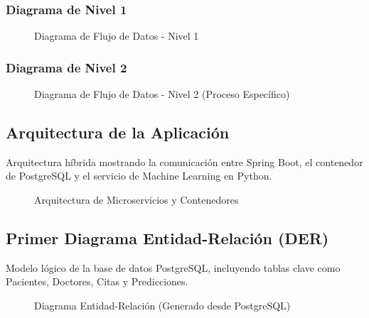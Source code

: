 \documentclass[12pt, a4paper]{article}
\begin{document}
	\subsubsection{Diagrama de Nivel 1}
	\begin{figure}[H]
		\centering
		\caption{Diagrama de Flujo de Datos - Nivel 1}
	\end{figure}
	
	\subsubsection{Diagrama de Nivel 2}
	\begin{figure}[H]
		\centering
		\caption{Diagrama de Flujo de Datos - Nivel 2 (Proceso Específico)}
	\end{figure}
	
	\subsection{Arquitectura de la Aplicación}
	Arquitectura híbrida mostrando la comunicación entre Spring Boot, el contenedor de PostgreSQL y el servicio de Machine Learning en Python.
	\begin{figure}[H]
		\centering
		\caption{Arquitectura de Microservicios y Contenedores}
	\end{figure}
	
	\subsection{Primer Diagrama Entidad-Relación (DER)}
	Modelo lógico de la base de datos PostgreSQL, incluyendo tablas clave como Pacientes, Doctores, Citas y Predicciones.
	\begin{figure}[H]
		\centering
		\caption{Diagrama Entidad-Relación (Generado desde PostgreSQL)}
	\end{figure}
	
\end{document}
